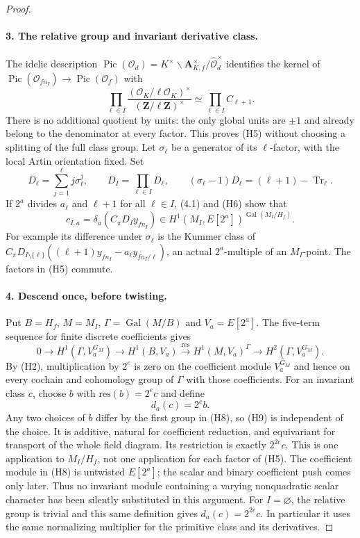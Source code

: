 \documentclass[11pt]{article}
\theoremstyle{definition}
\theoremstyle{remark}
\begin{document}
\begin{proof}
\paragraph{3. The relative group and invariant derivative class.}
The idelic description
$\operatorname{Pic}(\mathcal O_d)=
K^\times\backslash\mathbf A_{K,f}^\times/\widehat{\mathcal O}_d^\times$
identifies the kernel of
$\operatorname{Pic}(\mathcal O_{fn_I})\to
\operatorname{Pic}(\mathcal O_f)$ with
\[
 \prod_{\ell\in I}
 \frac{(\mathcal O_K/\ell\mathcal O_K)^\times}
      {(\mathbf Z/\ell\mathbf Z)^\times}
       \simeq\prod_{\ell\in I}C_{\ell+1}.               \tag{H5}
\]
There is no additional quotient by units: the only global units
are $\pm1$ and already belong to the denominator at every factor.
This proves (H5) without choosing a splitting of the full class
group. Let $\sigma_\ell$ be a generator of its $\ell$-factor,
with the local Artin orientation fixed. Set
\[
 D_\ell=\sum_{j=1}^{\ell}j\sigma_\ell^j,\qquad
 D_I=\prod_{\ell\in I}D_\ell,\qquad
 (\sigma_\ell-1)D_\ell=(\ell+1)-\operatorname{Tr}_\ell. \tag{H6}
\]
If $2^a$ divides $a_\ell$ and $\ell+1$ for all $\ell\in I$,
(4.1) and (H6) show that
\[
 c_{I,a}=\delta_a(C_\pi D_Iy_{fn_I})
 \in H^1(M_I,E[2^a])^{\operatorname{Gal}(M_I/H_f)}.     \tag{H7}
\]
For example its difference under $\sigma_\ell$ is the Kummer
class of
$C_\pi D_{I\setminus\{\ell\}}
 ((\ell+1)y_{fn_I}-a_\ell y_{fn_I/\ell})$, an actual
$2^a$-multiple of an $M_I$-point. The factors in (H5) commute.

\paragraph{4. Descend once, before twisting.}
Put $B=H_f$, $M=M_I$, $\Gamma=\operatorname{Gal}(M/B)$ and
$V_a=E[2^a]$. The five-term sequence for finite discrete coefficients
\cite[formula (4.1.4.1), p.~96]{nekovar} gives
\[
 0\longrightarrow H^1(\Gamma,V_a^{G_M})
 \longrightarrow H^1(B,V_a)
 \xrightarrow{\mathrm{res}} H^1(M,V_a)^\Gamma
 \longrightarrow H^2(\Gamma,V_a^{G_M}).                \tag{H8}
\]
By (H2), multiplication by $2^e$ is zero on the coefficient
module $V_a^{G_M}$ and hence on every cochain and cohomology
group of $\Gamma$ with those coefficients. For an invariant class
$c$, choose $b$ with $\mathrm{res}(b)=2^e c$ and define
\[
                         d_a(c)=2^e b.                  \tag{H9}
\]
Any two choices of $b$ differ by the first group in (H8), so (H9)
is independent of the choice. It is additive, natural for
coefficient reduction, and equivariant for transport of the whole
field diagram. Its restriction is exactly $2^{2e}c$.
This is one application to $M_I/H_f$, not one application for
each factor of (H5). The coefficient module in (H8) is untwisted
$E[2^a]$; the scalar and binary coefficient push comes only later.
Thus no invariant module containing a varying nonquadratic scalar
character has been silently substituted in this argument.
For $I=\varnothing$, the relative group is trivial and this same
definition gives $d_a(c)=2^{2e}c$. In particular it uses the same
normalizing multiplier for the primitive class and its derivatives.


\end{proof}
\end{document}
